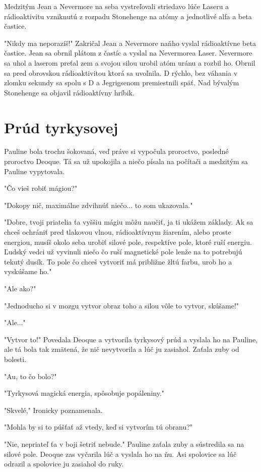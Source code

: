 \documentclass{book}
\begin{document}
Medzitým Jean a Nevermore na seba vystreľovali striedavo lúče Laseru a rádioaktivitu vzniknutú z rozpadu Stonehenge na atómy a jednotlivé alfa a beta častice.

"Nikdy ma neporazíš!"$ $ Zakričal Jean a Nevermore naňho vyslal rádioaktívne beta častice. Jean sa obrnil plátom z častíc a vyslal na Nevermorea Laser. Nevermore sa uhol a laserom preťal zem a svojou silou urobil atóm uránu a rozbil ho. Obrnil sa pred obrovskou rádioaktivitou ktorá sa uvoľnila. D rýchlo, bez váhania v zlomku sekundy sa spolu s D a Jegrigsenom premiestnili späť. Nad bývalým Stonehenge sa objavil rádioaktívny hríbik.

\chapter{Prúd tyrkysovej}

Pauline bola trochu šokovaná, veď práve si vypočula proroctvo, posledné proroctvo Deoque. Tá sa už upokojila a niečo písala na počítači a medzitým sa Pauline vypytovala.

"$ $Čo vieš robiť mágiou?"

"$ $Dokopy nič, maximálne zdvihnúť niečo... to som ukazovala."

"$ $Dobre, tvoji priatelia ťa vyššiu mágiu môžu naučiť, ja ti ukážem základy. Ak sa chceš ochrániť pred tlakovou vlnou, rádioaktívnym žiarením, alebo proste energiou, musíš okolo seba urobiť silové pole, respektíve pole, ktoré ruší energiu. Ľudský vedci už vyvinuli niečo čo ruší magnetické pole lenže na to potrebujú tekutý dusík. To pole čo chceš vytvoriť má približne žltú farbu, urob ho a vyskúšame ho."

"$ $Ale ako?"

"$ $Jednoducho si v mozgu vytvor obraz toho a silou vôle to vytvor, skúšame!"

"$ $Ale..."

"$ $Vytvor to!"$ $ Povedala Deoque a vytvorila tyrkysový prúd a vyslala ho na Pauline, ale tá bola tak zmätená, že nič nevytvorila a lúč ju zasiahol. Zaťala zuby od bolesti.

"$ $Au, to čo bolo?"

"$ $Tyrkysová magická energia, spôsobuje popáleniny."

"$ $Skvelé,"$ $ Ironicky poznamenala.

"$ $Mohla by si to púšťať až vtedy, keď si vytvorím tú obranu?"

"$ $Nie, nepriateľ ťa v boji šetriť nebude."$ $ Pauline zaťala zuby a sústredila sa na silové pole. Deoque zas vyčarila lúč a vyslala ho na ňu. Asi spolovice sa lúč odrazil a spolovice ju zasiahol do ruky.
\end{document}
